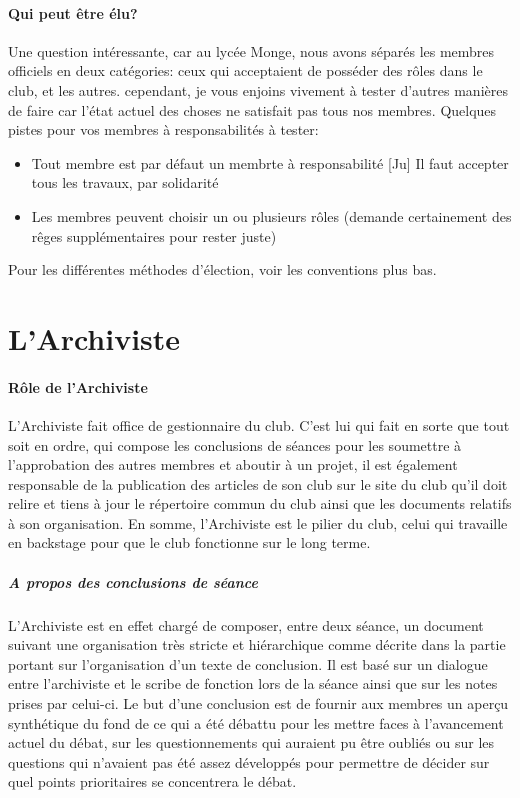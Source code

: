 \documentclass[a4paper,12pt]{article}
\begin{document}
\paragraph{Qui peut être élu?}
Une question intéressante, car au lycée Monge, nous avons séparés les membres officiels en deux catégories: ceux qui acceptaient de posséder des rôles dans le club, et les autres. cependant, je vous enjoins vivement à tester d'autres manières de faire car l'état actuel des choses ne satisfait pas tous nos membres. Quelques pistes pour vos membres à responsabilités à tester:
\begin{itemize}
 \item Tout membre est par défaut un membrte à responsabilité [Ju] Il faut accepter tous les travaux, par solidarité
 \item Les membres peuvent choisir un ou plusieurs rôles (demande certainement des rêges supplémentaires pour rester juste)
\end{itemize}

Pour les différentes méthodes d'élection, voir les conventions plus bas.

\section{L'Archiviste}
\paragraph{Rôle de l'Archiviste}
L'Archiviste fait office de gestionnaire du club. C'est lui qui fait en sorte que tout soit en ordre, qui compose les conclusions de séances pour les soumettre à l'approbation des autres membres et aboutir à un projet, il est également responsable de la publication des articles de son club sur le site du club qu'il doit relire et tiens à jour le répertoire commun du club ainsi que les documents relatifs à son organisation. En somme, l'Archiviste est le pilier du club, celui qui travaille en backstage pour que le club fonctionne sur le long terme.
\subparagraph{A propos des conclusions de séance}
L'Archiviste est en effet chargé de composer, entre deux séance, un document suivant une organisation très stricte et hiérarchique comme décrite dans la partie portant sur l'organisation d'un texte de conclusion. Il est basé sur un dialogue entre l'archiviste et le scribe de fonction lors de la séance ainsi que sur les notes prises par celui-ci. Le but d'une conclusion est de fournir aux membres un aperçu synthétique du fond de ce qui a été débattu pour les mettre faces à l'avancement actuel du débat, sur les questionnements qui auraient pu être oubliés ou sur les questions qui n'avaient pas été assez développés pour permettre de décider sur quel points prioritaires se concentrera le débat.
\end{document}
